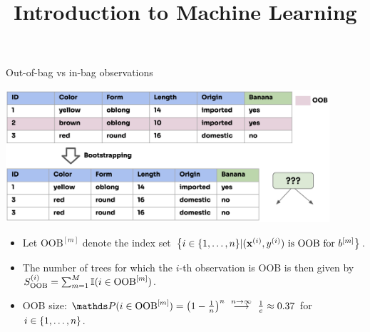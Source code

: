 \documentclass[11pt,compress,t,notes=noshow,xcolor=table]{beamer}
\title{Introduction to Machine Learning}
\institute{\href{https://compstat-lmu.github.io/lecture_i2ml/}{compstat-lmu.github.io/lecture\_i2ml}}
\date{}
\begin{document}
\sloppy


\begin{vbframe}{Out-of-bag vs in-bag observations}
  
\begin{center}
  \includegraphics[width=0.9\textwidth]{figure_man/forest-oob.png}
\end{center}

\footnotesize

\begin{itemize}
  \item Let $\text{OOB}^{[m]}$ denote the index set 
  $\left \{i \in \{1, \ldots, n\} | (\mathbf{x}^{(i)}, y^{(i)}) \text{ is OOB for } b^{[m]} \right \}$.
  \item The number of trees for which the $i$-th observation is OOB is then 
  given by $S_{\text{OOB}}^{(i)} = 
  \sum_{m = 1}^M \mathbb{I}(i \in \text{OOB}^{[m]})$.
  \item OOB size: $\P(i \in \text{OOB}^{[m]}) = \left(1 - \frac{1}{n}\right)^n 
  \ \stackrel{n \to \infty}{\longrightarrow} \ \frac{1}{e} \approx 0.37$ for 
  $i \in \{1, \ldots, n\}$.
\end{itemize}

\end{vbframe}
\end{document}

